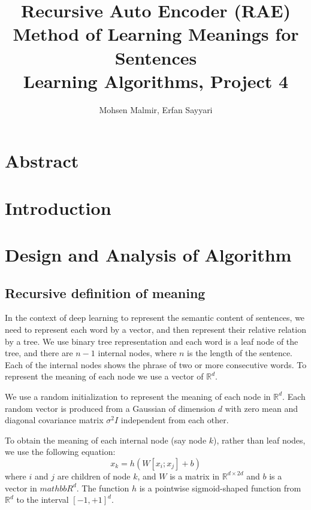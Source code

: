 \documentclass[twoside,12pt]{article}
\begin{document}
\title{Recursive Auto Encoder (RAE)
Method of Learning Meanings for Sentences\\  Learning Algorithms, Project 4}
\author{Mohsen Malmir, Erfan Sayyari}
\maketitle

\section{Abstract}

\section{Introduction}

\section{Design and Analysis of Algorithm}

\subsection{Recursive definition of meaning}
In the context of deep learning to represent the semantic content of sentences, we need to represent each word by a vector, and then represent their relative relation by a tree. We use binary tree representation and each word is a leaf node of the tree, and there are $n-1$ internal nodes, where $n$ is the length of the sentence. Each of the internal nodes shows the phrase of two or more consecutive words. To represent the meaning of each node we use a vector of $\mathbb{R}^d$.

We use a random initialization to represent the meaning of each node in $\mathbb{R}^d$. Each random vector is produced from a Gaussian of dimension $d$ with zero mean and diagonal covariance matrix $\sigma^2I$ independent from each other. 

To obtain the meaning of each internal node (say node $k$), rather than leaf nodes, we use the following equation:
\begin{equation}
x_k=h(W[x_i;x_j]+b)
\end{equation}
where $i$ and $j$ are children of node $k$, and $W$ is a matrix in $\mathbb{R}^{d\times2d}$ and $b$ is a vector in $mathbb{R}^d$. The function $h$ is a pointwise sigmoid-shaped function from $\mathbb{R}^d$ to the interval $[-1,+1]^d$.
\end{document}
